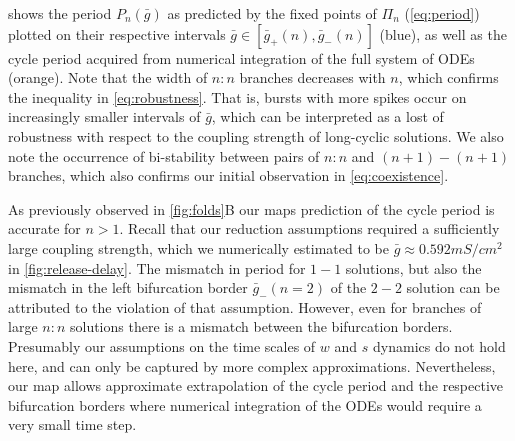  shows the period $P_n(\bar g)$ as predicted by the fixed points of $\Pi_n$ (\cref{eq:period}) plotted on their respective intervals $\bar g \in [\bar g_+(n),\bar g_-(n)]$ (blue), as well as the cycle period acquired from numerical integration of the full system of ODEs (orange).
Note that the width of $n:n$ branches decreases with $n$, which confirms the inequality in \cref{eq:robustness}.
That is, bursts with more spikes occur on increasingly smaller intervals of $\bar g$, which can be interpreted as a lost of robustness with respect to the coupling strength of long-cyclic solutions.
We also note the occurrence of bi-stability between pairs of $n:n$ and $(n+1)-(n+1)$ branches, which also confirms our initial observation in
\cref{eq:coexistence}.

As previously observed in \cref{fig:folds}B our maps prediction of the cycle period is accurate for $n>1$.
Recall that our reduction assumptions required a sufficiently large coupling strength, which we numerically estimated to be $\bar g \approx 0.592\si{mS/cm^2}$ in \cref{fig:release-delay}.
The mismatch in period for $1-1$ solutions, but also the mismatch in the left bifurcation border $\bar g_-(n=2)$ of the $2-2$ solution can be attributed to the violation of that assumption.
However, even for branches of large $n:n$ solutions there is a mismatch between the bifurcation borders.
Presumably our assumptions on the time scales of $w$ and $s$ dynamics do not hold here, and can only be captured by more complex approximations.
Nevertheless, our map allows approximate extrapolation of the cycle period and the respective bifurcation borders where numerical integration of the ODEs would require a very small time step.
